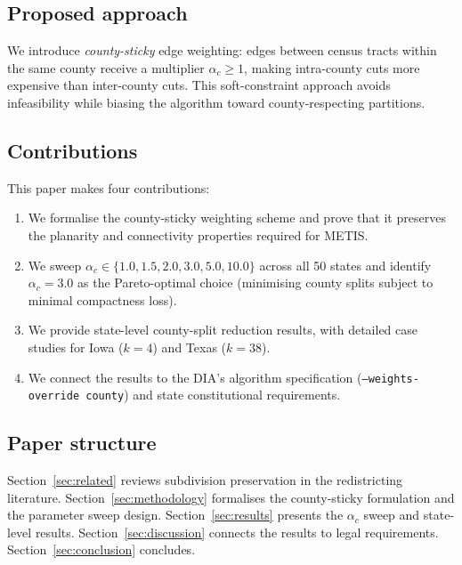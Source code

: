 \subsection*{Proposed approach}

We introduce \emph{county-sticky} edge weighting: edges between census
tracts within the same county receive a multiplier $\alpha_c \geq 1$,
making intra-county cuts more expensive than inter-county cuts.
This soft-constraint approach avoids infeasibility while biasing the
algorithm toward county-respecting partitions.

\subsection*{Contributions}

This paper makes four contributions:

\begin{enumerate}
  \item We formalise the county-sticky weighting scheme and prove that it
    preserves the planarity and connectivity properties required for METIS.
  \item We sweep $\alpha_c \in \{1.0, 1.5, 2.0, 3.0, 5.0, 10.0\}$ across
    all 50 states and identify $\alpha_c = 3.0$ as the Pareto-optimal
    choice (minimising county splits subject to minimal compactness loss).
  \item We provide state-level county-split reduction results, with detailed
    case studies for Iowa ($k{=}4$) and Texas ($k{=}38$).
  \item We connect the results to the DIA's algorithm specification
    (\texttt{--weights-override county}) and state constitutional requirements.
\end{enumerate}

\subsection*{Paper structure}

Section~\ref{sec:related} reviews subdivision preservation in the
redistricting literature.
Section~\ref{sec:methodology} formalises the county-sticky formulation
and the parameter sweep design.
Section~\ref{sec:results} presents the $\alpha_c$ sweep and state-level
results.
Section~\ref{sec:discussion} connects the results to legal requirements.
Section~\ref{sec:conclusion} concludes.
